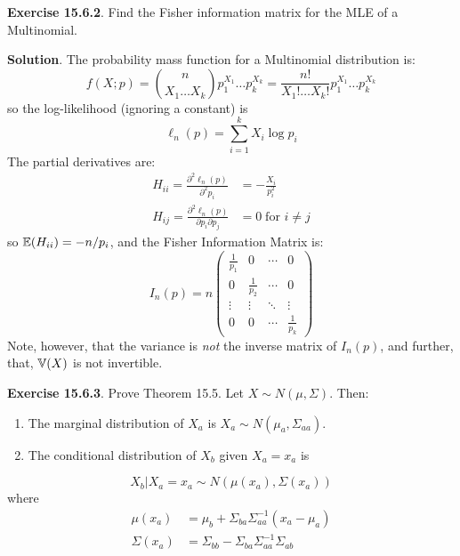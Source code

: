 \textbf{Exercise 15.6.2}. Find the Fisher information matrix for the MLE
of a Multinomial.

\textbf{Solution}.
The probability mass function for a Multinomial distribution is:
\[
f(X; p) = \binom{n}{X_{1} \dots X_{k}} p_{1}^{X_{1}} \dots p_{k}^{X_{k}} = \frac{n!}{X_{1}! \dots X_{k}!} p_{1}^{X_{1}} \dots p_{k}^{X_{k}}
\]
so the log-likelihood (ignoring a constant) is
\[
\ell_{n}(p) = \sum_{i=1}^{k} X_{i} \log p_{i}
\]
The partial derivatives are:
\begin{align*}
H_{ii} = \frac{\partial^{2} \ell_{n}(p)}{\partial^{2} p_{i}} &= -\frac{X_{i}}{p_{i}^{2}} \\
H_{ij} = \frac{\partial^{2} \ell_{n}(p)}{\partial p_{i} \partial p_{j}} &= 0 \; \text{for } i \neq j
\end{align*}
so \(\operatorname{\mathbb{E}}(H_{ii}) = - n/p_{i}\), and the Fisher Information Matrix
is:
\[
I_{n}(p) = n \begin{pmatrix}
\frac{1}{p_{1}} & 0 & \cdots & 0 \\
0 & \frac{1}{p_{2}} & \cdots & 0 \\
\vdots & \vdots & \ddots & \vdots \\
0 & 0 & \cdots & \frac{1}{p_{k}}
\end{pmatrix}
\]
Note, however, that the variance is \emph{not} the inverse matrix of
\(I_{n}(p)\), and further, that, \(\operatorname{\mathbb{V}}(X)\) is not invertible.

\textbf{Exercise 15.6.3}. Prove Theorem 15.5.
Let \(X \sim N(\mu, \Sigma)\). Then:
\begin{enumerate}[tightlist,label={\arabic*.}]
\item
  The marginal distribution of \(X_a\) is
  \(X_a \sim N(\mu_a, \Sigma_{aa})\).
\item
  The conditional distribution of \(X_b\) given \(X_a = x_a\) is
\end{enumerate}
\[
X_b | X_a = x_a \sim N(\mu(x_a), \Sigma(x_a))
\]
where
\begin{align*}
\mu(x_a) &= \mu_b + \Sigma_{ba} \Sigma_{aa}^{-1} (x_a - \mu_a) \\
\Sigma(x_a) &= \Sigma_{bb} - \Sigma_{ba}\Sigma_{aa}^{-1}\Sigma_{ab}
\end{align*}

